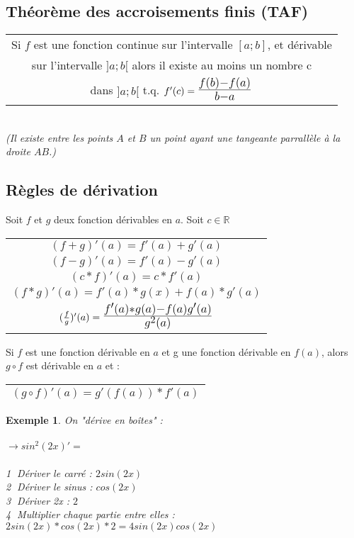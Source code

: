 \documentclass[12pt, a4paper]{book}
\newtheorem*{exemple}{Exemple}
\def\mathLarge#1{\mbox{\LARGE $#1$}}
\begin{document}
\subsection{Théorème des accroisements finis (TAF)}
\begin{tabular}{ |c|}
    \hline
    Si $f$ est une fonction continue sur l'intervalle $[a;b]$, et dérivable \\
    sur l'intervalle $]a;b[$ alors il existe au moins un nombre c \\
    dans $]a;b[$ t.q. $f'(c)= \mathLarge{\frac{f(b)-f(a)}{b-a}}$\\
    \hline
\end{tabular}
\newline \\
\textit{(Il existe entre les points $A$ et $B$ un point ayant une tangeante parrallèle à la droite $AB$.)}
\newpage
\subsection{Règles de dérivation}
Soit $f$ et $g$ deux fonction dérivables en $a$. Soit $c \in \mathbb{R}$\\
\begin{center}
\begin{tabular}{ |c|}
    \hline
    $(f+g)'(a) = f'(a) + g'(a)$\\
    $(f-g)'(a) = f'(a) - g'(a)$\\
    $(c*f)'(a) = c*f'(a)$\\
    $(f*g)'(a) = f'(a)*g(x) + f(a)*g'(a)$\\
    $(\frac{f}{g})'(a) = \mathLarge{\frac{f'(a)*g(a) - f(a)g'(a)}{g^2(a)}}$\\
    \hline
\end{tabular}
\end{center}

Si $f$ est une fonction dérivable en $a$ et g une fonction dérivable en $f(a)$, alors $g \circ f$ est dérivable en $a$ et :\\
\begin{center}
    \begin{tabular}{ |c|}
        \hline
        $(g \circ f)'(a) = g'(f(a)) * f'(a)$\\
        \hline
    \end{tabular}
    \end{center}
\begin{exemple}
    On "dérive en boîtes" :\\
    \newline \\
    $\rightarrow sin^{2}(2x)' =$\\
    \newline \\
    \textcircled{1} Dériver le carré : $2sin(2x)$\\
    \textcircled{2} Dériver le sinus : $cos(2x)$\\
    \textcircled{3} Dériver 2x : $2$\\
    \textcircled{4} Multiplier chaque partie entre elles :$2sin(2x)*cos(2x)*2 = 4sin(2x)cos(2x)$\\
\end{exemple}
\end{document}

